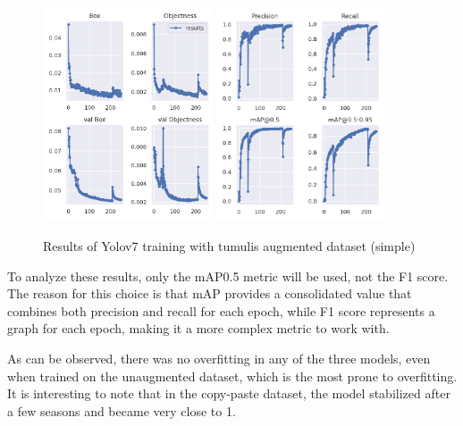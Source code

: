 \begin{figure}[H]
    \centering
    {{\includegraphics[width=5cm]{images/training/mamoas/maia1.png} }}
    \qquad
    {{\includegraphics[width=5cm]{images/training/mamoas/maia2.png} }}
    \caption{Results of Yolov7 training with tumulis augmented dataset (simple)}
    \label{fig:tumuliyolomaia}
\end{figure}

To analyze these results, only the mAP0.5 metric will be used, not the F1 score. The reason for this choice is that mAP provides a consolidated value that combines both precision and recall for each epoch, while F1 score represents a graph for each epoch, making it a more complex metric to work with.

As can be observed, there was no overfitting in any of the three models, even when trained on the unaugmented dataset, which is the most prone to overfitting. It is interesting to note that in the copy-paste dataset, the model stabilized after a few seasons and became very close to 1.

